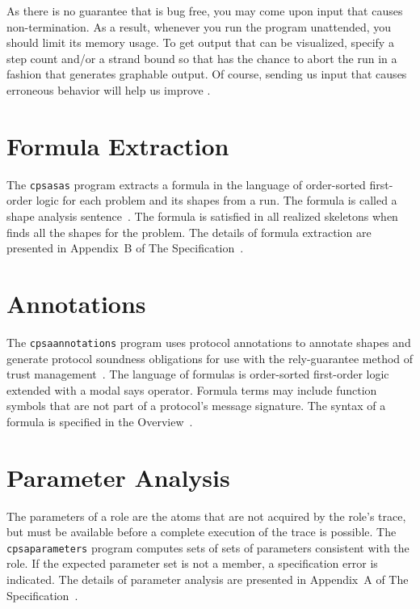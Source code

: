 \documentclass[12pt]{article}
\begin{document}
As there is no guarantee that {\cpsa} is bug free, you may come upon
input that causes non-termination.  As a result, whenever you run the
program unattended, you should limit its memory usage.  To get output
that can be visualized, specify a step count and/or a strand bound so
that {\cpsa} has the chance to abort the run in a fashion that
generates graphable output.  Of course, sending us input that causes
erroneous behavior will help us improve {\cpsa}.

\section{Formula Extraction}\label{sec:formulas}

The \texttt{cpsasas} program extracts a formula in the language of
order-sorted first-order logic for each problem and its shapes from a
{\cpsa} run. The formula is called a shape analysis
sentence~\cite{Ramsdell12}. The formula is satisfied in all realized
skeletons when {\cpsa} finds all the shapes for the problem.  The
details of formula extraction are presented in Appendix~B of The
{\cpsa} Specification~\cite{cpsaspec09}.

\section{Annotations}\label{sec:annotations}

The \texttt{cpsaannotations} program uses protocol annotations to
annotate shapes and generate protocol soundness obligations for use
with the rely-guarantee method of trust
management~\cite{GuttmanEtAl04,RamsdellEtAl09}.  The language of
formulas is order-sorted first-order logic extended with a modal says
operator.  Formula terms may include function symbols that are not
part of a protocol's message signature.  The syntax of a formula is
specified in the {\cpsa} Overview~\cite{cpsaoverview09}.

\section{Parameter Analysis}\label{sec:parameters}

The parameters of a role are the atoms that are not acquired by the
role's trace, but must be available before a complete execution of the
trace is possible. The \texttt{cpsaparameters} program computes sets
of sets of parameters consistent with the role. If the expected
parameter set is not a member, a specification error is indicated.
The details of parameter analysis are presented in Appendix~A of The
{\cpsa} Specification~\cite{cpsaspec09}.
\end{document}
